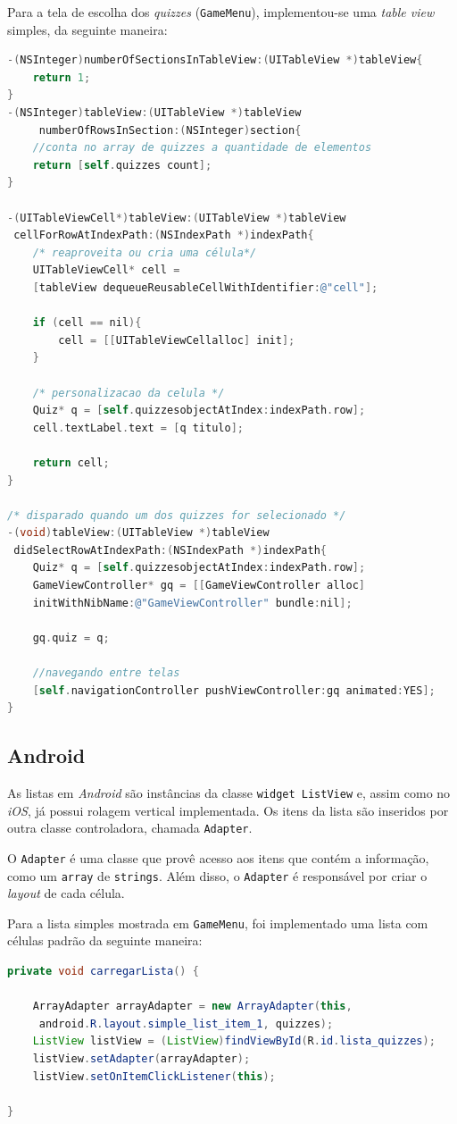     Para a tela de escolha dos \emph{quizzes} (\texttt{GameMenu}), implementou-se uma \emph{table view} simples, da seguinte maneira:
\begin{lstlisting}[language=C]  
-(NSInteger)numberOfSectionsInTableView:(UITableView *)tableView{
    return 1;
}
-(NSInteger)tableView:(UITableView *)tableView
	 numberOfRowsInSection:(NSInteger)section{
    //conta no array de quizzes a quantidade de elementos
    return [self.quizzes count];
}

-(UITableViewCell*)tableView:(UITableView *)tableView
 cellForRowAtIndexPath:(NSIndexPath *)indexPath{
    /* reaproveita ou cria uma célula*/
    UITableViewCell* cell = 
    [tableView dequeueReusableCellWithIdentifier:@"cell"];
	
    if (cell == nil){
        cell = [[UITableViewCellalloc] init];
    }
     
    /* personalizacao da celula */
    Quiz* q = [self.quizzesobjectAtIndex:indexPath.row];
    cell.textLabel.text = [q titulo];
	
    return cell;
}

/* disparado quando um dos quizzes for selecionado */
-(void)tableView:(UITableView *)tableView
 didSelectRowAtIndexPath:(NSIndexPath *)indexPath{
    Quiz* q = [self.quizzesobjectAtIndex:indexPath.row];
    GameViewController* gq = [[GameViewController alloc] 
	initWithNibName:@"GameViewController" bundle:nil];
    
	gq.quiz = q;
	
	//navegando entre telas
    [self.navigationController pushViewController:gq animated:YES];
}
\end{lstlisting} 
   
    \subsection{Android}
            
			As listas em \emph{Android} são instâncias da classe \texttt{widget ListView} e, assim como no \emph{iOS}, já possui rolagem vertical implementada. Os itens da lista são inseridos por outra classe controladora, chamada \texttt{Adapter}.
            
			O \texttt{Adapter} é uma classe que provê acesso aos itens que contém a informação, como um \texttt{array} de \texttt{strings}. Além disso, o \texttt{Adapter} é responsável por criar o \emph{layout} de cada célula.
           
		    Para a lista simples mostrada em \texttt{GameMenu}, foi implementado uma lista com células padrão da seguinte maneira:
\begin{lstlisting}[language=Java,frame=single,breaklines=true]   
private void carregarLista() {
     
    ArrayAdapter arrayAdapter = new ArrayAdapter(this,
	 android.R.layout.simple_list_item_1, quizzes);
    ListView listView = (ListView)findViewById(R.id.lista_quizzes);
    listView.setAdapter(arrayAdapter);
    listView.setOnItemClickListener(this);
     
}
\end{lstlisting} 

